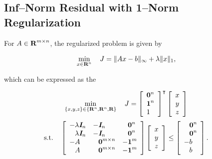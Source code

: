 \documentclass{article}
\begin{document}
\subsection{Inf--Norm Residual with 1--Norm Regularization}

    
    For $A\in\textbf{R}^{m\times n}$, the regularized problem is given by

    \begin{align*}
        \min_{x\in\textbf{R}^n} \quad J &= \|Ax-b\|_\infty + \lambda \|x\|_1,
    \end{align*}

    which can be expressed as the \LP

    \begin{align*}
        \min_{\{x,y,z\}\in\{\textbf{R}^n,\textbf{R}^n,\textbf{R}\}} \quad 
        J & = 
        \left[\begin{array}{l}
            \textbf{0}^{n}
            \\
            \textbf{1}^{n}
            \\
            1
        \end{array}\right]^\intercal
        \left[\begin{array}{c}
            x   \\
            y   \\
            z
        \end{array}\right]
    \end{align*}
    \begin{align*}
        \st\quad 
        \left[\begin{array}{lll}
                -\lambda\eye_n
            &
                -\eye_n
            &
                \minus \zeros^{n}
            \\
                \minus \lambda\eye_n
            &
                -\eye_n
            &
                \minus \zeros^{n}
            \\
                -A
            &
                \minus \zeros^{m\times n}
            &
                -\ones^{m}
            \\
                \minus A
            & 
                \minus \zeros^{m\times n}
            &
                -\ones^{m}
        \end{array}\right]
        &
        \left[\begin{array}{c}
            x   \\
            y   \\
            z
        \end{array}\right]
        \leq
        \left[\begin{array}{l}
            \minus  \zeros^n     \\
            \minus  \zeros^n      \\
            -b           \\
            \minus b
        \end{array}\right].
    \end{align*}
\end{document}

